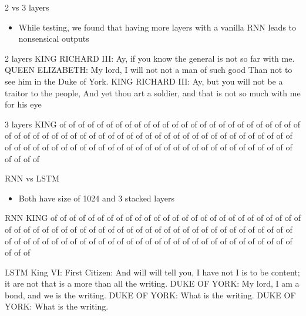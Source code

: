 \documentclass{beamer}
\begin{document}
\begin{frame}{2 vs 3 layers}
\begin{itemize}
    \item While testing, we found that having more layers with a vanilla RNN leads to nonsensical outputs
\end{itemize}
\begin{block}{2 layers}
KING RICHARD III: Ay, if you know the general is not so far with me. QUEEN ELIZABETH: My lord, I will not not a man of such good Than not to see him in the Duke of York. KING RICHARD III: Ay, but you will not be a traitor to the people, And yet thou art a soldier, and that is not so much with me for his eye
\end{block}

\begin{block}{3 layers}
KING of of of of of of of of of of of of of of of of of of of of of of of of of of of of of of of of of of of of of of of of of of of of of of of of of of of of of of of of of of of of of of of of of of of of of of of of of of of of of of of of of of of of of of of of of of of of
\end{block}
\end{frame}

\begin{frame}{RNN vs LSTM}
\begin{itemize}
\item Both have size of 1024 and 3 stacked layers
\end{itemize}
\begin{block}{RNN}
KING of of of of of of of of of of of of of of of of of of of of of of of of of of of of of of of of of of of of of of of of of of of of of of of of of of of of of of of of of of of of of of of of of of of of of of of of of of of of of of of of of of of of of of of of of of of of
\end{block}

\begin{block}{LSTM}
King VI: First Citizen: And will will tell you, I have not I is to be content; it are not that is a more than all the writing. DUKE OF YORK: My lord, I am a bond, and we is the writing. DUKE OF YORK: What is the writing. DUKE OF YORK: What is the writing.
\end{block}
\end{frame}
\end{document}
